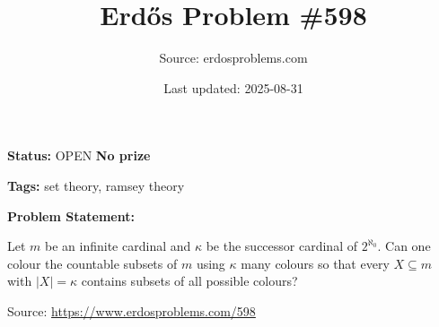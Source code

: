 \documentclass{article}
\title{Erd\H{o}s Problem \#598}
\date{Last updated: 2025-08-31}
\author{Source: erdosproblems.com}
\begin{document}
\maketitle

\noindent\textbf{Status:} OPEN \quad \textbf{No prize}

\noindent\textbf{Tags:} set theory, ramsey theory

\medskip
\noindent\textbf{Problem Statement:}

Let $m$ be an infinite cardinal and $\kappa$ be the successor cardinal of $2^{\aleph_0}$. Can one colour the countable subsets of $m$ using $\kappa$ many colours so that every $X\subseteq m$ with $\lvert X\rvert=\kappa$ contains subsets of all possible colours?

\bigskip
\noindent\small{Source: \url{https://www.erdosproblems.com/598}}
\end{document}
